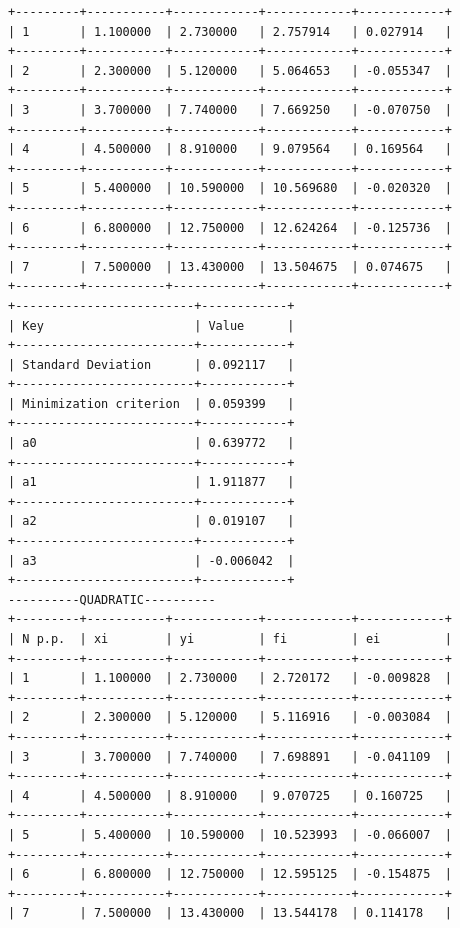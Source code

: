 \documentclass[12pt,one column]{article}
\begin{document}
\begin{verbatim}
+---------+-----------+------------+------------+------------+
| 1       | 1.100000  | 2.730000   | 2.757914   | 0.027914   | 
+---------+-----------+------------+------------+------------+
| 2       | 2.300000  | 5.120000   | 5.064653   | -0.055347  | 
+---------+-----------+------------+------------+------------+
| 3       | 3.700000  | 7.740000   | 7.669250   | -0.070750  | 
+---------+-----------+------------+------------+------------+
| 4       | 4.500000  | 8.910000   | 9.079564   | 0.169564   | 
+---------+-----------+------------+------------+------------+
| 5       | 5.400000  | 10.590000  | 10.569680  | -0.020320  | 
+---------+-----------+------------+------------+------------+
| 6       | 6.800000  | 12.750000  | 12.624264  | -0.125736  | 
+---------+-----------+------------+------------+------------+
| 7       | 7.500000  | 13.430000  | 13.504675  | 0.074675   | 
+---------+-----------+------------+------------+------------+
+-------------------------+------------+
| Key                     | Value      | 
+-------------------------+------------+
| Standard Deviation      | 0.092117   | 
+-------------------------+------------+
| Minimization criterion  | 0.059399   | 
+-------------------------+------------+
| a0                      | 0.639772   | 
+-------------------------+------------+
| a1                      | 1.911877   | 
+-------------------------+------------+
| a2                      | 0.019107   | 
+-------------------------+------------+
| a3                      | -0.006042  | 
+-------------------------+------------+
----------QUADRATIC----------
+---------+-----------+------------+------------+------------+
| N p.p.  | xi        | yi         | fi         | ei         | 
+---------+-----------+------------+------------+------------+
| 1       | 1.100000  | 2.730000   | 2.720172   | -0.009828  | 
+---------+-----------+------------+------------+------------+
| 2       | 2.300000  | 5.120000   | 5.116916   | -0.003084  | 
+---------+-----------+------------+------------+------------+
| 3       | 3.700000  | 7.740000   | 7.698891   | -0.041109  | 
+---------+-----------+------------+------------+------------+
| 4       | 4.500000  | 8.910000   | 9.070725   | 0.160725   | 
+---------+-----------+------------+------------+------------+
| 5       | 5.400000  | 10.590000  | 10.523993  | -0.066007  | 
+---------+-----------+------------+------------+------------+
| 6       | 6.800000  | 12.750000  | 12.595125  | -0.154875  | 
+---------+-----------+------------+------------+------------+
| 7       | 7.500000  | 13.430000  | 13.544178  | 0.114178   | 

\end{verbatim}
\end{document}
